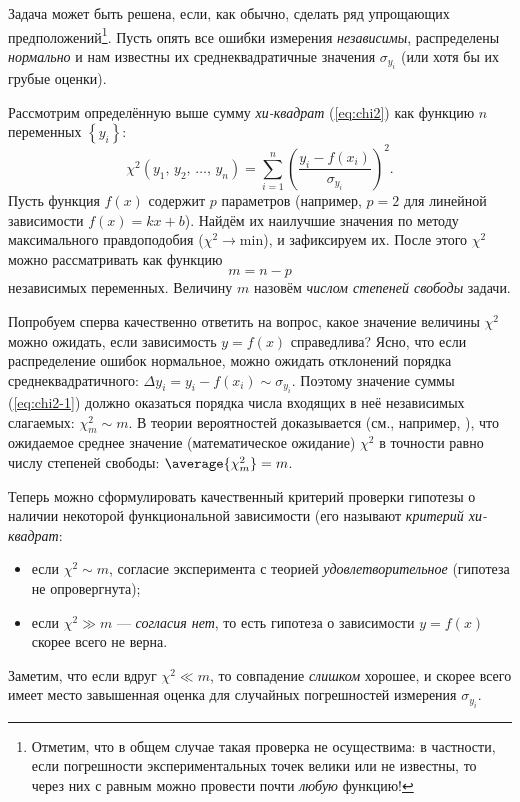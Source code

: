 Задача может быть решена, если, как обычно, сделать ряд упрощающих
предположений\footnote{Отметим, что в общем случае такая проверка не осуществима:
в частности, если погрешности экспериментальных точек велики или не
известны, то через них с равным 
можно провести почти \emph{любую} функцию!}. 
Пусть опять все ошибки измерения \emph{независимы},
распределены \emph{нормально} и нам известны их
среднеквадратичные значения $\sigma_{y_{i}}$ 
(или хотя бы их грубые оценки).

Рассмотрим определённую выше сумму \emph{хи-квадрат} (\ref{eq:chi2}) 
как функцию $n$ переменных $\left\{ y_{i}\right\}$:
\begin{equation}
\chi^{2}\!\left(y_{1},\,y_{2},\,\ldots,\,y_{n}\right)=\sum\limits _{i=1}^{n}\left(\frac{y_{i}-f\!\left(x_{i}\right)}{\sigma_{y_{i}}}\right)^{2}.\label{eq:chi2-1}
\end{equation}
Пусть функция $f\!\left(x\right)$ содержит $p$ 
параметров (например, $p=2$ для линейной зависимости $f\!\left(x\right)=kx+b$).
Найдём их наилучшие значения по методу максимального правдоподобия
($\chi^{2}\to\mathrm{min}$), и зафиксируем их. После этого $\chi^{2}$
можно рассматривать как функцию 
\[
m=n-p
\]
независимых переменных. Величину $m$ назовём \emph{числом степеней свободы} задачи.

Попробуем сперва качественно ответить на вопрос, какое значение
величины $\chi^{2}$ можно ожидать, если зависимость $y=f\!\left(x\right)$
справедлива? Ясно, что если распределение ошибок нормальное, можно
ожидать отклонений порядка среднеквадратичного: $\Delta y_{i}=y_{i}-f\!\left(x_{i}\right)\sim\sigma_{y_{i}}$.
Поэтому значение суммы (\ref{eq:chi2-1}) должно оказаться порядка
числа входящих в неё независимых слагаемых: $\chi_{m}^{2}\sim m$.
В теории вероятностей доказывается (см., например, \cite{hudson}), что ожидаемое среднее значение (математическое ожидание) $\chi^{2}$ в точности равно числу степеней свободы: $\average{\chi_{m}^{2}}=m$.

Теперь можно сформулировать качественный критерий проверки
гипотезы о наличии некоторой функциональной зависимости (его называют
\emph{критерий хи-квадрат}:
\begin{itemize}
\item  если $\chi^{2}\sim m$, согласие эксперимента с теорией \emph{удовлетворительное}
(гипотеза не опровергнута); 
\item если $\chi^{2}\gg m$ --- \emph{согласия нет}, 
то есть гипотеза о зависимости $y=f\!\left(x\right)$ скорее всего не верна.
\end{itemize}
Заметим, что если вдруг $\chi^{2}\ll m$, то совпадение \emph{слишком}
хорошее, и скорее всего имеет место завышенная оценка для случайных
погрешностей измерения $\sigma_{y_{i}}$.

